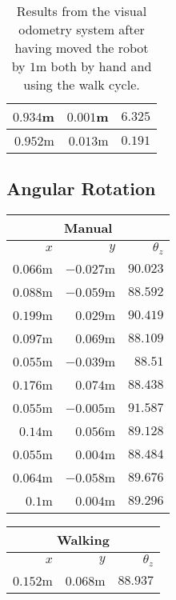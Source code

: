 \begin{appendices}
\begin{table}[!h]
\begin{tabular}{ r r r }
		$0.934$m &
		$0.001$m &
		$6.325$\textdegree{} \\

		\midrule
		$0.952$m &
		$0.013$m &
		$0.191$\textdegree{} \\
		\bottomrule
	\end{tabular}

	\caption{Results from the visual odometry system after having moved the robot by $1$m both by hand and using the walk cycle.}
	\label{tab:eval_vo}
\end{table}

\subsection{Angular Rotation}

\begin{table}[!h]
	\centering
	\begin{tabular}{ r r r }
		\toprule
		\multicolumn{3}{c}{\textbf{Manual}} \\
		\midrule
		\textbf{$x$} & \textbf{$y$} & \textbf{$\theta_z$} \\
		\midrule
		$0.066$m &
		$-0.027$m &
		$90.023$\textdegree{} \\

		$0.088$m &
		$-0.059$m &
		$88.592$\textdegree{} \\

		$0.199$m &
		$0.029$m &
		$90.419$\textdegree{} \\

		$0.097$m &
		$0.069$m &
		$88.109$\textdegree{} \\

		$0.055$m &
		$-0.039$m &
		$88.51$\textdegree{} \\

		$0.176$m &
		$0.074$m &
		$88.438$\textdegree{} \\

		$0.055$m &
		$-0.005$m &
		$91.587$\textdegree{} \\

		$0.14$m &
		$0.056$m &
		$89.128$\textdegree{} \\

		$0.055$m &
		$0.004$m &
		$88.484$\textdegree{} \\

		$0.064$m &
		$-0.058$m &
		$89.676$\textdegree{} \\

		\midrule
		$0.1$m &
		$0.004$m &
		$89.296$\textdegree{} \\
		\bottomrule
	\end{tabular}
	\hspace{2ex}
	\begin{tabular}{ r r r }
		\toprule
		\multicolumn{3}{c}{\textbf{Walking}} \\
		\midrule
		\textbf{$x$} & \textbf{$y$} & \textbf{$\theta_z$} \\
		\midrule
		$0.152$m &
		$0.068$m &
		$88.937$\textdegree{} \\


\end{tabular}
\end{table}
\end{appendices}
